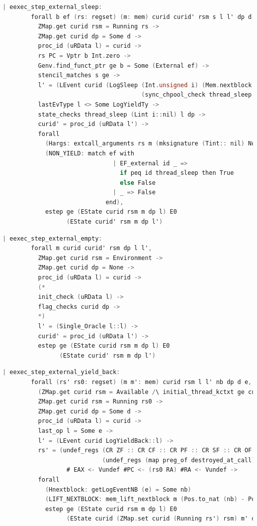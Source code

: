 \begin{lstlisting}[language=C]
    | eexec_step_external_sleep:
        forall b ef (rs: regset) (m: mem) curid curid' rsm s l l' dp d i,
          ZMap.get curid rsm = Running rs ->
          ZMap.get curid dp = Some d ->
          proc_id (uRData l) = curid ->
          rs PC = Vptr b Int.zero ->
          Genv.find_funct_ptr ge b = Some (External ef) ->
          stencil_matches s ge ->
          l' = (LEvent curid (LogSleep (Int.unsigned i) (Mem.nextblock m)
                                       (sync_chpool_check thread_sleep ((Lint i)::nil) (uRData l) d))::l) ->
          lastEvType l <> Some LogYieldTy ->
          state_checks thread_sleep (Lint i::nil) l dp ->
          curid' = proc_id (uRData l') ->
          forall
            (Hargs: extcall_arguments rs m (mksignature (Tint:: nil) None cc_default) (Vint i:: nil))
            (NON_YIELD: match ef with
                               | EF_external id _ => 
                                 if peq id thread_sleep then True
                                 else False
                               | _ => False
                             end),
            estep ge (EState curid rsm m dp l) E0
                  (EState curid' rsm m dp l')
\end{lstlisting}


\begin{lstlisting}[language=C]
    | eexec_step_external_empty:
        forall m curid curid' rsm dp l l',
          ZMap.get curid rsm = Environment ->
          ZMap.get curid dp = None ->
          proc_id (uRData l) = curid ->
          (*
          init_check (uRData l) ->
          flag_checks curid dp ->
          *)
          l' = (Single_Oracle l::l) ->
          curid' = proc_id (uRData l') ->
          estep ge (EState curid rsm m dp l) E0
                (EState curid' rsm m dp l')
\end{lstlisting}

\begin{lstlisting}[language=C]
    | eexec_step_external_yield_back:
        forall (rs' rs0: regset) (m m': mem) curid rsm l l' nb dp d e,
          (ZMap.get curid rsm = Available /\ initial_thread_kctxt ge curid l = Some rs0) \/
          ZMap.get curid rsm = Running rs0 ->
          ZMap.get curid dp = Some d ->
          proc_id (uRData l) = curid ->
          last_op l = Some e ->
          l' = (LEvent curid LogYieldBack::l) ->
          rs' = (undef_regs (CR ZF :: CR CF :: CR PF :: CR SF :: CR OF :: nil)
                            (undef_regs (map preg_of destroyed_at_call) rs0)) 
                  # EAX <- Vundef #PC <- (rs0 RA) #RA <- Vundef ->
          forall
            (Hnextblock: getLogEventNB (e) = Some nb)
            (LIFT_NEXTBLOCK: mem_lift_nextblock m (Pos.to_nat (nb) - Pos.to_nat (Mem.nextblock m) % nat) = m'),
            estep ge (EState curid rsm m dp l) E0
                  (EState curid (ZMap.set curid (Running rs') rsm) m' dp l').
\end{lstlisting}


